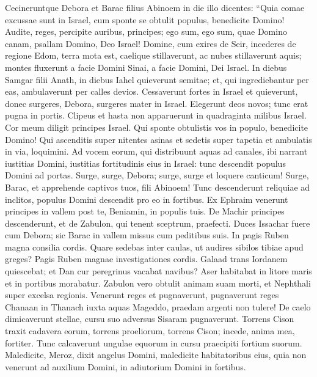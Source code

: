 \begin{biblechapter}  
\verse Cecineruntque Debora et Barac filius Abinoem in die illo dicentes: 
\verse “Quia comae excussae sunt in Israel, cum sponte se obtulit populus, benedicite Domino! 
\verse Audite, reges, percipite auribus, principes; ego sum, ego sum, quae Domino canam, psallam Domino, Deo Israel! 
\verse Domine, cum exires de Seir, incederes de regione Edom, terra mota est, caelique stillaverunt, ac nubes stillaverunt aquis; 
\verse montes fluxerunt a facie Domini Sinai, a facie Domini, Dei Israel. 
\verse In diebus Samgar filii Anath, in diebus Iahel quieverunt semitae; et, qui ingrediebantur per eas, ambulaverunt per calles devios. 
\verse Cessaverunt fortes in Israel et quieverunt, donec surgeres, Debora, surgeres mater in Israel. 
\verse Elegerunt deos novos; tunc erat pugna in portis. Clipeus et hasta non apparuerunt in quadraginta milibus Israel. 
\verse Cor meum diligit principes Israel. Qui sponte obtulistis vos in populo, benedicite Domino! 
\verse Qui ascenditis super nitentes asinas et sedetis super tapetia et ambulatis in via, loquimini. 
\verse Ad vocem eorum, qui distribuunt aquas ad canales, ibi narrant iustitias Domini, iustitias fortitudinis eius in Israel: tunc descendit populus Domini ad portas. 
\verse Surge, surge, Debora; surge, surge et loquere canticum! Surge, Barac, et apprehende captivos tuos, fili Abinoem! 
\verse Tunc descenderunt reliquiae ad inclitos, populus Domini descendit pro eo in fortibus. 
\verse Ex Ephraim venerunt principes in vallem post te, Beniamin, in populis tuis. De Machir principes descenderunt, et de Zabulon, qui tenent sceptrum, praefecti. 
\verse Duces Issachar fuere cum Debora; sic Barac in vallem missus cum peditibus suis. In pagis Ruben magna consilia cordis. 
\verse Quare sedebas inter caulas, ut audires sibilos tibiae apud greges? Pagis Ruben magnae investigationes cordis. 
\verse Galaad trans Iordanem quiescebat; et Dan cur peregrinus vacabat navibus? Aser habitabat in litore maris et in portibus morabatur. 
\verse Zabulon vero obtulit animam suam morti, et Nephthali super excelsa regionis. 
\verse Venerunt reges et pugnaverunt, pugnaverunt reges Chanaan in Thanach iuxta aquas Mageddo, praedam argenti non tulere! 
\verse De caelo dimicaverunt stellae, cursu suo adversus Sisaram pugnaverunt. 
\verse Torrens Cison traxit cadavera eorum, torrens proeliorum, torrens Cison; incede, anima mea, fortiter. 
\verse Tunc calcaverunt ungulae equorum in cursu praecipiti fortium suorum. 
\verse Maledicite, Meroz, dixit angelus Domini, maledicite habitatoribus eius, quia non venerunt ad auxilium Domini, in adiutorium Domini in fortibus. 

\end{biblechapter}
